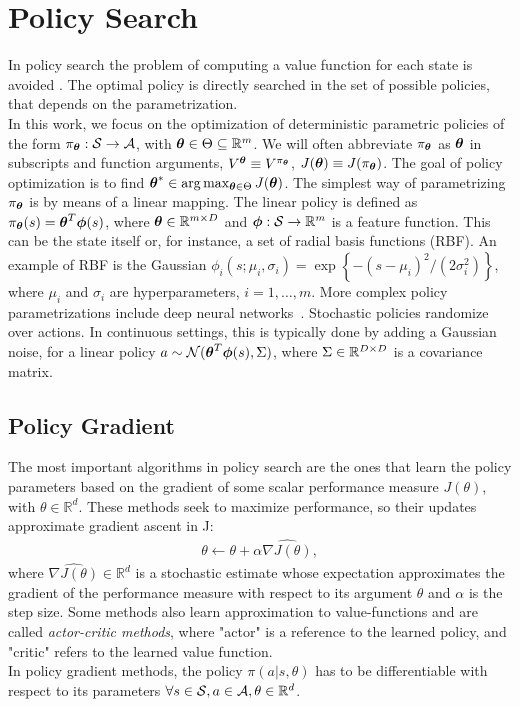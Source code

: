 \section{Policy Search}\label{sec:ps}
In policy search the problem of computing a value function for each state is avoided . The optimal policy is directly searched in the set of possible policies, that depends on the parametrization.\\
\newline
In this work, we focus on the optimization of deterministic parametric policies of the form $\pi_{\boldsymbol{\theta}}:\mathcal{S}\to\mathcal{A}$, with $\boldsymbol{\theta}\in\Theta\subseteq\mathbb{R}^m$. We will often abbreviate $\pi_{\boldsymbol{\theta}}$ as $\boldsymbol{\theta}$ in subscripts and function arguments, \eg $V^{\boldsymbol{\theta}} \equiv V^{\pi_{\boldsymbol{\theta}}}$, $J(\boldsymbol{\theta}) \equiv J(\pi_{\boldsymbol{\theta}})$. The goal of policy optimization is to find $\boldsymbol{\theta}^{*}\in\arg\max_{\boldsymbol{\theta}\in\Theta}J({\boldsymbol{\theta}})$.
The simplest way of parametrizing $\pi_{\boldsymbol{\theta}}$ is by means of a linear mapping. The linear policy is defined as $\pi_{\boldsymbol{\theta}}(s) = \boldsymbol{\theta}^T\boldsymbol{\phi}(s)$, where $\boldsymbol{\theta}\in\mathbb{R}^{m\times D}$ and $\boldsymbol{\phi}:\mathcal{S}\to\mathbb{R}^m$ is a feature function. This can be the state itself or, for instance, a set of radial basis functions (RBF). An example of RBF is the Gaussian $\phi_i(s; \mu_i, \sigma_i) = \exp\left\{-{(s -\mu_i)^2}\big/{(2\sigma_i^2)}\right\}$, where $\mu_i$ and $\sigma_i$ are hyperparameters, $i=1,\dots,m$. More complex policy parametrizations include deep neural networks~\citep{duan2016benchmarking}. 
Stochastic policies randomize over actions. In continuous settings, this is typically done by adding a Gaussian noise, \eg for a linear policy $a\sim\mathcal{N}(\boldsymbol{\theta}^T\boldsymbol{\phi}(s),\Sigma)$, where $\Sigma\in\mathbb{R}^{D\times D}$ is a covariance matrix.

\subsection{Policy Gradient}
The most important algorithms in policy search are the ones that learn the policy parameters based on the gradient of some scalar performance measure $J(\theta)$, with $\theta \in \mathbb{R}^d$. These methods seek to maximize performance, so their updates approximate gradient ascent in J:
\begin{align}
\theta \leftarrow \theta + \alpha \widehat{\nabla J(\theta)}, \label{eq:grad}
\end{align}
where $\widehat{\nabla J(\theta)} \in \mathbb{R}^d$ is a stochastic estimate whose expectation approximates the gradient of the performance measure with respect to its argument $\theta$ and $\alpha$ is the step size. Some methods also learn approximation to value-functions and are called \emph{actor-critic methods}, where "actor" is a reference to the learned policy, and "critic" refers to the learned value function.\\
\newline
In policy gradient methods, the policy $\pi(a|s,\theta)$ has to be differentiable with respect to its parameters $\forall s \in \mathcal{S}, a \in \mathcal{A}, \theta \in \mathbb{R}^d$.

